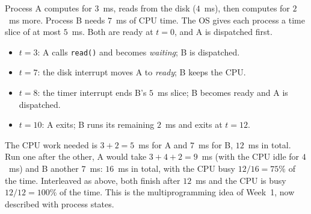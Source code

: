 \documentclass[11pt,a4paper]{article}
\newcommand{\cmd}[1]{\texttt{#1}}
\begin{document}
\begin{example}
Process A computes for $3$~ms, reads from the disk ($4$~ms), then computes for $2$~ms more. Process B needs $7$~ms of CPU time. The OS gives each process a time slice of at most $5$~ms. Both are ready at $t = 0$, and A is dispatched first.

\begin{center}
\end{center}

\begin{itemize}
  \item $t = 3$: A calls \cmd{read()} and becomes \emph{waiting}; B is dispatched.
  \item $t = 7$: the disk interrupt moves A to \emph{ready}; B keeps the CPU.
  \item $t = 8$: the timer interrupt ends B's $5$~ms slice; B becomes ready and A is dispatched.
  \item $t = 10$: A exits; B runs its remaining $2$~ms and exits at $t = 12$.
\end{itemize}
The CPU work needed is $3 + 2 = 5$~ms for A and $7$~ms for B, $12$~ms in total. Run one after the other, A would take $3 + 4 + 2 = 9$~ms (with the CPU idle for $4$~ms) and B another $7$~ms: $16$~ms in total, with the CPU busy $12/16 = 75\%$ of the time. Interleaved as above, both finish after $12$~ms and the CPU is busy $12/12 = 100\%$ of the time. This is the multiprogramming idea of Week~1, now described with process states.
\end{example}

\end{document}
